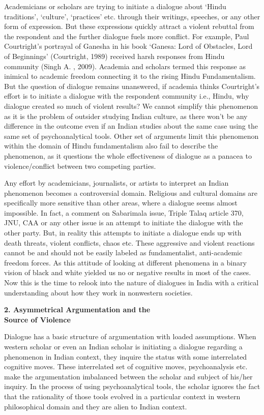 \begin{multicols}{2}
\noi
Academicians or scholars are trying to initiate a dialogue about ‘Hindu traditions’, ‘culture’,
‘practices’ etc. through their writings, speeches, or any other form of expression. But these
expressions quickly attract a violent rebuttal from the respondent and the further dialogue fuels
more conflict. For example, Paul Courtright’s portrayal of Ganesha in his book ‘Ganesa: Lord of
Obstacles, Lord of Beginnings’ (Courtright, 1989) received harsh responses from Hindu
community (Singh A. , 2009). Academia and scholars termed this response as inimical to
academic freedom connecting it to the rising Hindu Fundamentalism. But the question of dialogue
remains unanswered, if academia thinks Courtright’s effort is to initiate a dialogue with the
respondent community i.e., Hindu, why dialogue created so much of violent results? We cannot
simplify this phenomenon as it is the problem of outsider studying Indian culture, as there won’t
be any difference in the outcome even if an Indian studies about the same case using the same set
of psychoanalytical tools. Other set of arguments limit this phenomenon within the domain of
Hindu fundamentalism also fail to describe the phenomenon, as it questions the whole
effectiveness of dialogue as a panacea to violence/conflict between two competing parties.

\noi
Any effort by academicians, journalists, or artists to interpret an Indian phenomenon becomes a
controversial domain. Religious and cultural domains are specifically more sensitive than other
areas, where a dialogue seems almost impossible. In fact, a comment on Sabarimala issue, Triple
Talaq article 370, JNU, CAA or any other issue is an attempt to initiate the dialogue with the
other party. But, in reality this attempts to initiate a dialogue ends up with death threats, violent
conflicts, chaos etc. These aggressive and violent reactions cannot be and should not be easily
labeled as fundamentalist, anti-academic freedom forces. As this attitude of looking at different
phenomena in a binary vision of black and white yielded us no or negative results in most of the
cases. Now this is the time to relook into the nature of dialogues in India with a critical
understanding about how they work in nonwestern societies.

\noi
{\large \bfseries 2. Asymmetrical Argumentation and the\\ Source of Violence}

\noi
Dialogue has a basic structure of argumentation with loaded assumptions. When western scholar
or even an Indian scholar is initiating a dialogue regarding a phenomenon in Indian context, they inquire the status with some interrelated cognitive moves. These interrelated set of cognitive
moves, psychoanalysis etc. make the argumentation imbalanced between the scholar and subject
of his/her inquiry. In the process of using psychoanalytical tools, the scholar ignores the fact that
the rationality of those tools evolved in a particular context in western philosophical domain and
they are alien to Indian context.


\end{multicols}
